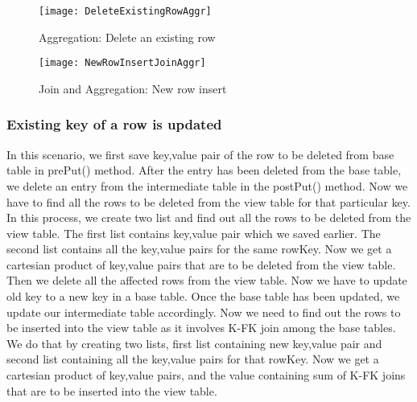 \documentclass[11pt,a4paper,bibtotoc,idxtotoc,headsepline,footsepline,footexclude,BCOR12mm,DIV13]{scrbook}
\begin{document}
\begin{figure}
    \centering
    \texttt{[image: DeleteExistingRowAggr]}
    \caption{Aggregation: Delete an existing row}
    \label{sec:deleteexistingrow}
    
\end{figure} 


\begin{figure}
    \centering
    \texttt{[image: NewRowInsertJoinAggr]}
    \caption{Join and Aggregation: New row insert}
    \label{sec:insertnewrowjoinandaggr}
    
\end{figure}

\newpage



\subsubsection{Existing key of a row is updated}

In this scenario, we first save key,value pair of the row to be deleted from base table in prePut() method. After the entry has been deleted from the base table, we delete an entry from the intermediate table in the postPut() method. Now we have to find all the rows to be deleted from the view table for that particular key. In this process, we create two list and find out all the rows to be deleted from the view table. The first list contains key,value pair which we saved earlier. The second list contains all the key,value pairs for the same rowKey. Now we get a cartesian product of key,value pairs that are to be deleted from the view table. Then we delete all the affected rows from the view table. Now we have to update old key to a new key in a base table. Once the base table has been updated, we update our intermediate table accordingly. Now we need to find out the rows to be inserted into the view table as it involves K-FK join among the base tables. We do that by creating two lists, first list containing new key,value pair and second list containing all the key,value pairs for that rowKey. Now we get a cartesian product of key,value pairs, and the value containing sum of K-FK joins that are to be inserted into the view table.
\end{document}
